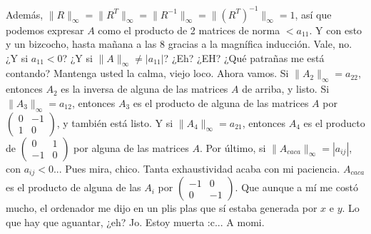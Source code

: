 \documentclass{article}
\newcommand\tab[1][0.6cm]{\hspace*{#1}}
\newcommand\nl{\newline\tab}
\begin{document}
	Además, $\|R\|_\infty = \|R^T\|_\infty = \|R^{-1}\|_\infty = \|\left( R^T\right) ^{-1}\|_\infty=1$, así que podemos expresar $A$ como el producto de 2 matrices de norma $< a_{11}$.\nl\nl
	Y con esto y un bizcocho, hasta mañana a las 8 gracias a la magnífica inducción. \nl
	Vale, no. ¿Y si $a_{11} < 0$? ¿Y si $\|A\|_\infty \neq |a_{11}|$? ¿Eh? ¿EH? ¿Qué patrañas me está contando? \nl
	Mantenga usted la calma, viejo loco. Ahora vamos.\nl\nl
	Si $\|A_2\|_\infty = a_{22}$, entonces $A_2$ es la inversa de alguna de las matrices $A$ de arriba, y listo.\nl
	Si $\|A_3\|_\infty = a_{12}$, entonces $A_3$ es el producto de alguna de las matrices $A$ por
	$\begin{pmatrix}
	0 & -1 \\
	1 & 0 
	\end{pmatrix} $,
	y también está listo.\nl 
	Y si $\|A_4\|_\infty = a_{21}$, entonces $A_4$ es el producto de
	$\begin{pmatrix}
	0 & 1 \\
	-1 & 0 
	\end{pmatrix} $ por alguna de las matrices $A$.\nl
	Por último, si $\|A_{caca}\|_\infty = |a_{ij}|$, con $a_{ij} < 0$... Pues mira, chico. Tanta exhaustividad acaba con mi paciencia. $A_{caca}$ es el producto de alguna de las $A_i$ por  $\begin{pmatrix}
	-1 & 0 \\
	0 & -1 
	\end{pmatrix} $. Que aunque a mí me costó mucho, el ordenador me dijo en un plis plas que sí estaba generada por $x$ e $y$. Lo que hay que aguantar, ¿eh? 	\nl 		
	Jo. Estoy muerta :c... A momi.
	
\end{document}
